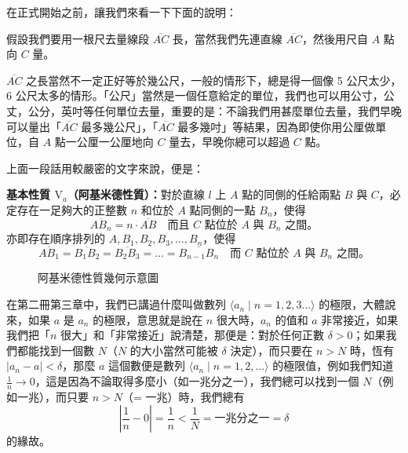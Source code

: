 在正式開始之前，讓我們來看一下下面的說明：

假設我們要用一根尺去量線段 $\overline{AC}$ 長，當然我們先連直線 $\overline{AC}$，然後用尺自 $A$ 點向 $C$ 量。

$\overline{AC}$ 之長當然不一定正好等於幾公尺，一般的情形下，總是得一個像 5 公尺太少，6 公尺太多的情形。「公尺」當然是一個任意給定的單位，我們也可以用公寸，公丈，公分，英吋等任何單位去量，重要的是：不論我們用甚麼單位去量，我們早晚可以量出「$\overline{AC}$ 最多幾公尺」，「$\overline{AC}$ 最多幾吋」等結果，因為即使你用公厘做單位，自 $A$ 點一公厘一公厘地向 $C$ 量去，早晚你總可以超過 $C$ 點。

上面一段話用較嚴密的文字來說，便是：

\noindent\textbf{基本性質 $\mathrm{V}_a$（阿基米德性質）：}對於直線 $l$ 上 $A$ 點的同側的任給兩點 $B$ 與 $C$，必定存在一足夠大的正整數 $n$ 和位於 $A$ 點同側的一點 $B_n$，使得
\[ \overline{AB_n} = n \cdot \overline{AB} \quad \text{而且 $C$ 點位於 $A$ 與 $B_n$ 之間。} \]
亦即存在順序排列的 $A, B_1, B_2, B_3, \dots, B_n$，使得
\[ \overline{AB_1} = \overline{B_1B_2} = \overline{B_2B_3} = \dots = \overline{B_{n-1}B_n} \quad \text{而 $C$ 點位於 $A$ 與 $B_n$ 之間。} \]

\begin{figure}[H]
\centering
{}
\caption{阿基米德性質幾何示意圖}
\label{fig:b3s-a1-22}
\end{figure}

在第二冊第三章中，我們已講過什麼叫做數列 $\langle a_n \mid n=1,2,3\dots \rangle$ 的極限，大體說來，如果 $a$ 是 $a_n$ 的極限，意思就是說在 $n$ 很大時，$a_n$ 的值和 $a$ 非常接近，如果我們把「$n$ 很大」和「非常接近」說清楚，那便是：對於任何正數 $\delta > 0$；如果我們都能找到一個數 $N$（$N$ 的大小當然可能被 $\delta$ 決定），而只要在 $n > N$ 時，恆有 $|a_n - a| < \delta$，那麼 $a$ 這個數便是數列 $\langle a_n \mid n=1,2,\dots \rangle$ 的極限值，例如我們知道 $\frac{1}{n} \to 0$，這是因為不論取得多麼小（如一兆分之一），我們總可以找到一個 $N$（例如一兆），而只要 $n > N$（= 一兆）時，我們總有
\[ \left| \frac{1}{n} - 0 \right| = \frac{1}{n} < \frac{1}{N} = \text{一兆分之一} = \delta \]
的緣故。


